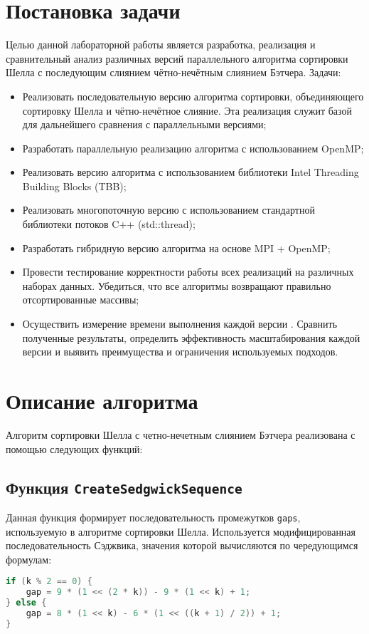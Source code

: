 \documentclass[a4paper,12pt]{article}
\begin{document}
\section{Постановка задачи}
Целью данной лабораторной работы является разработка, реализация и сравнительный анализ различных версий параллельного алгоритма сортировки Шелла с последующим слиянием чётно-нечётным слиянием Бэтчера.
Задачи:
\begin{itemize}
    \item Реализовать последовательную версию алгоритма сортировки, объединяющего сортировку Шелла и чётно-нечётное слияние. Эта реализация служит базой для дальнейшего сравнения с параллельными версиями;
    \item Разработать параллельную реализацию алгоритма с использованием OpenMP;
    \item Реализовать версию алгоритма с использованием библиотеки Intel Threading Building Blocks (TBB);
    \item Реализовать многопоточную версию с использованием стандартной библиотеки потоков C++ (std::thread);
    \item Разработать гибридную версию алгоритма на основе MPI + OpenMP;
    \item Провести тестирование корректности работы всех реализаций на различных наборах данных. Убедиться, что все алгоритмы возвращают правильно отсортированные массивы;
    \item Осуществить измерение времени выполнения каждой версии . Сравнить полученные результаты, определить эффективность масштабирования каждой версии и выявить преимущества и ограничения используемых подходов.
\end{itemize}
\newpage

\section{Описание алгоритма}
Алгоритм сортировки Шелла с четно-нечетным слиянием Бэтчера реализована с помощью следующих функций:

\subsection{Функция \texttt{CreateSedgwickSequence}}
Данная функция формирует последовательность промежутков \texttt{gaps}, используемую в алгоритме сортировки Шелла. Используется модифицированная последовательность Сэджвика, значения которой вычисляются по чередующимся формулам:
\begin{lstlisting}[language=C++,caption={Формулы генерации последовательности Седжвика}]
if (k % 2 == 0) {
    gap = 9 * (1 << (2 * k)) - 9 * (1 << k) + 1;
} else {
    gap = 8 * (1 << k) - 6 * (1 << ((k + 1) / 2)) + 1;
}
\end{lstlisting}
\end{document}
